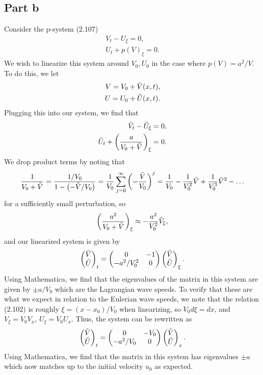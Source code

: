 \documentclass{article}
\begin{document}
\subsection{Part b}
Consider the p-system (2.107)
\begin{align*}
V_t-U_\xi=0,\\
U_t+p(V)_\xi=0.
\end{align*}
We wish to linearize this system around $V_0,U_0$ in the case where $p(V)=a^2/V$. To do this, we let
\begin{align*}
V=V_0+\Tilde V(x,t),\\
U=U_0+\Tilde U(x,t).
\end{align*}
Plugging this into our system,  we find that 
\begin{align*}
\Tilde V_t-\Tilde U_\xi=0,\\
\Tilde U_t+\left(\frac{a}{V_0+\Tilde V}\right)_\xi=0.
\end{align*}
We drop product terms by noting that 
\[
\frac{1}{V_0+\Tilde{V}}=\frac{1/V_0}{1-\left(-\Tilde{V}/V_0\right)}=\frac{1}{V_0}\sum_{j=0}^{\infty}\left(-\frac{\Tilde V}{V_0}\right)^j=\frac{1}{V_0}-\frac{1}{V_0^2}\Tilde{V}+\frac{1}{V_0^3}\Tilde{V}^2-\ldots
\]
for a sufficiently small perturbation, so
\[
\left(\frac{a^2}{V_0+\Tilde V}\right)_\xi\approx-\frac{a^2}{V_0^2}\Tilde{V}_\xi,
\]
and our linearized system is given by
\[
\begin{pmatrix}
\Tilde{V}\\\Tilde{U}
\end{pmatrix}_t=\begin{pmatrix}
0 &-1\\
-a^2/V_0^2 &0
\end{pmatrix}\begin{pmatrix}
\Tilde{V}\\\Tilde{U}
\end{pmatrix}_\xi.
\]
Using Mathematica, we find that the eigenvalues of the matrix in this system are given by $\pm a/V_0$ which are the Lagrangian wave speeds. To verify that these are what we expect in relation to the Eulerian wave speeds, we note that the relation (2.102) is roughly $\xi = (x-x_0)/V_0$ when linearizing, so $V_0d\xi=dx$, and $V_\xi=V_0V_x$, $U_\xi=V_0U_x$. Thus, the system can be rewritten as 
\[
\begin{pmatrix}
	\Tilde{V}\\\Tilde{U}
\end{pmatrix}_t=\begin{pmatrix}
	0 &-V_0\\
	-a^2/V_0 &0
\end{pmatrix}\begin{pmatrix}
	\Tilde{V}\\\Tilde{U}
\end{pmatrix}_x.
\]
Using Mathematica, we find that the matrix in this system has eigenvalues $\pm a$ which now matches up to the initial velocity $u_0$ as expected.
\end{document}
